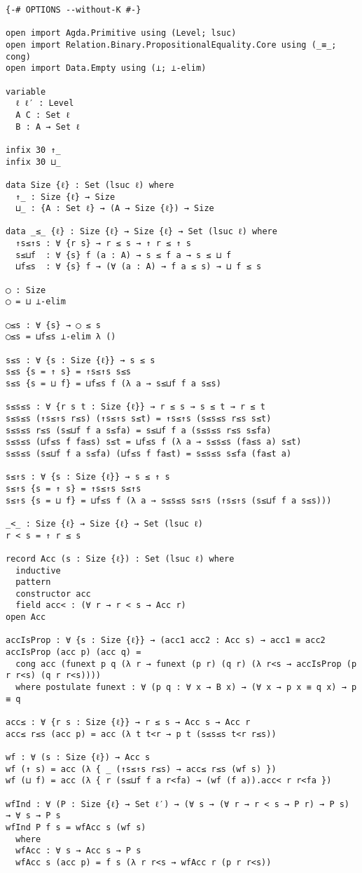 \documentclass[acmsmall,review,anonymous]{acmart}\settopmatter{printfolios=true,printccs=false,printacmref=false}
\begin{document}
\begin{verbatim}
{-# OPTIONS --without-K #-}

open import Agda.Primitive using (Level; lsuc)
open import Relation.Binary.PropositionalEquality.Core using (_≡_; cong)
open import Data.Empty using (⊥; ⊥-elim)

variable
  ℓ ℓ′ : Level
  A C : Set ℓ
  B : A → Set ℓ

infix 30 ↑_
infix 30 ⊔_

data Size {ℓ} : Set (lsuc ℓ) where
  ↑_ : Size {ℓ} → Size
  ⊔_ : {A : Set ℓ} → (A → Size {ℓ}) → Size

data _≤_ {ℓ} : Size {ℓ} → Size {ℓ} → Set (lsuc ℓ) where
  ↑s≤↑s : ∀ {r s} → r ≤ s → ↑ r ≤ ↑ s
  s≤⊔f  : ∀ {s} f (a : A) → s ≤ f a → s ≤ ⊔ f
  ⊔f≤s  : ∀ {s} f → (∀ (a : A) → f a ≤ s) → ⊔ f ≤ s

◯ : Size
◯ = ⊔ ⊥-elim

◯≤s : ∀ {s} → ◯ ≤ s
◯≤s = ⊔f≤s ⊥-elim λ ()

s≤s : ∀ {s : Size {ℓ}} → s ≤ s
s≤s {s = ↑ s} = ↑s≤↑s s≤s
s≤s {s = ⊔ f} = ⊔f≤s f (λ a → s≤⊔f f a s≤s)

s≤s≤s : ∀ {r s t : Size {ℓ}} → r ≤ s → s ≤ t → r ≤ t
s≤s≤s (↑s≤↑s r≤s) (↑s≤↑s s≤t) = ↑s≤↑s (s≤s≤s r≤s s≤t)
s≤s≤s r≤s (s≤⊔f f a s≤fa) = s≤⊔f f a (s≤s≤s r≤s s≤fa)
s≤s≤s (⊔f≤s f fa≤s) s≤t = ⊔f≤s f (λ a → s≤s≤s (fa≤s a) s≤t)
s≤s≤s (s≤⊔f f a s≤fa) (⊔f≤s f fa≤t) = s≤s≤s s≤fa (fa≤t a)

s≤↑s : ∀ {s : Size {ℓ}} → s ≤ ↑ s
s≤↑s {s = ↑ s} = ↑s≤↑s s≤↑s
s≤↑s {s = ⊔ f} = ⊔f≤s f (λ a → s≤s≤s s≤↑s (↑s≤↑s (s≤⊔f f a s≤s)))

_<_ : Size {ℓ} → Size {ℓ} → Set (lsuc ℓ)
r < s = ↑ r ≤ s

record Acc (s : Size {ℓ}) : Set (lsuc ℓ) where
  inductive
  pattern
  constructor acc
  field acc< : (∀ r → r < s → Acc r)
open Acc

accIsProp : ∀ {s : Size {ℓ}} → (acc1 acc2 : Acc s) → acc1 ≡ acc2
accIsProp (acc p) (acc q) =
  cong acc (funext p q (λ r → funext (p r) (q r) (λ r<s → accIsProp (p r r<s) (q r r<s))))
  where postulate funext : ∀ (p q : ∀ x → B x) → (∀ x → p x ≡ q x) → p ≡ q

acc≤ : ∀ {r s : Size {ℓ}} → r ≤ s → Acc s → Acc r
acc≤ r≤s (acc p) = acc (λ t t<r → p t (s≤s≤s t<r r≤s))

wf : ∀ (s : Size {ℓ}) → Acc s
wf (↑ s) = acc (λ { _ (↑s≤↑s r≤s) → acc≤ r≤s (wf s) })
wf (⊔ f) = acc (λ { r (s≤⊔f f a r<fa) → (wf (f a)).acc< r r<fa })

wfInd : ∀ (P : Size {ℓ} → Set ℓ′) → (∀ s → (∀ r → r < s → P r) → P s) → ∀ s → P s
wfInd P f s = wfAcc s (wf s)
  where
  wfAcc : ∀ s → Acc s → P s
  wfAcc s (acc p) = f s (λ r r<s → wfAcc r (p r r<s))
\end{verbatim}
\end{document}
